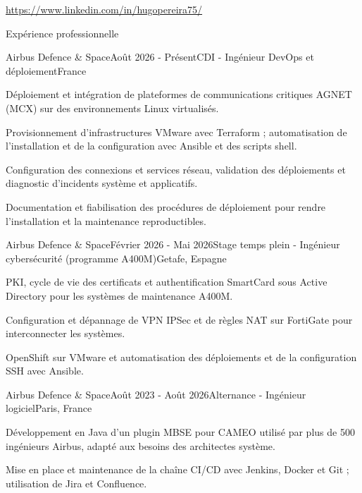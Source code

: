 \documentclass[
    10pt,
]{style} %
\begin{document}
    \begin{center}
        \url{https://www.linkedin.com/in/hugopereira75/}
    \end{center}


    \begin{rSection}{Expérience professionnelle}

        \begin{rSubsection}{Airbus Defence \& Space}{Août 2026 - Présent}{CDI - Ingénieur DevOps et déploiement}{France}
            \item Déploiement et intégration de plateformes de communications critiques AGNET (MCX) sur des environnements Linux virtualisés.
            \item Provisionnement d’infrastructures VMware avec Terraform ; automatisation de l’installation et de la configuration avec Ansible et des scripts shell.
            \item Configuration des connexions et services réseau, validation des déploiements et diagnostic d’incidents système et applicatifs.
            \item Documentation et fiabilisation des procédures de déploiement pour rendre l’installation et la maintenance reproductibles.
        \end{rSubsection}

        \begin{rSubsection}{Airbus Defence \& Space}{Février 2026 - Mai 2026}{Stage temps plein - Ingénieur cybersécurité (programme A400M)}{Getafe, Espagne}
            \item PKI, cycle de vie des certificats et authentification SmartCard sous Active Directory pour les systèmes de maintenance A400M.
            \item Configuration et dépannage de VPN IPSec et de règles NAT sur FortiGate pour interconnecter les systèmes.
            \item OpenShift sur VMware et automatisation des déploiements et de la configuration SSH avec Ansible.
        \end{rSubsection}

        \begin{rSubsection}{Airbus Defence \& Space}{Août 2023 - Août 2026}{Alternance - Ingénieur logiciel}{Paris, France}
            \item Développement en Java d’un plugin MBSE pour CAMEO utilisé par plus de 500 ingénieurs Airbus, adapté aux besoins des architectes système.
            \item Mise en place et maintenance de la chaîne CI/CD avec Jenkins, Docker et Git ; utilisation de Jira et Confluence.
        \end{rSubsection}


\end{rSection}
\end{document}
